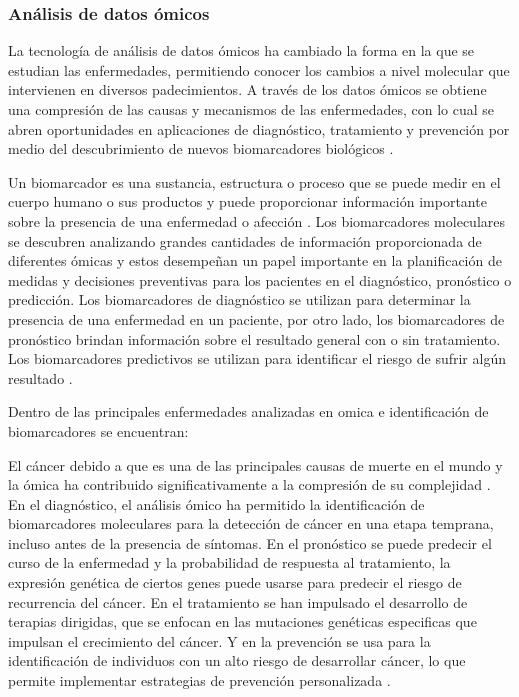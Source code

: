 \subsubsection{Análisis de datos ómicos}

La tecnología de análisis de datos ómicos ha cambiado la forma en la que se estudian las enfermedades, permitiendo conocer los cambios a nivel molecular que intervienen en diversos padecimientos. A través de los datos ómicos se obtiene una compresión de las causas y mecanismos de las enfermedades, con lo cual se abren oportunidades en aplicaciones de diagnóstico, tratamiento y prevención por medio del descubrimiento de nuevos biomarcadores biológicos \citep{reel2021using}.

Un biomarcador es una sustancia, estructura o proceso que se puede medir en el cuerpo humano o sus productos y puede proporcionar información importante sobre la presencia de una enfermedad o afección \citep{strimbu2010biomarkers}. Los biomarcadores moleculares se descubren analizando grandes cantidades de información proporcionada de diferentes ómicas y estos desempeñan un papel importante en la planificación de medidas y decisiones preventivas para los pacientes en el diagnóstico, pronóstico o predicción. Los biomarcadores de diagnóstico se utilizan para determinar la presencia de una enfermedad en un paciente, por otro lado, los biomarcadores de pronóstico brindan información sobre el resultado general con o sin tratamiento. Los biomarcadores predictivos se utilizan para identificar el riesgo de sufrir algún resultado \citep{carlomagno2017diagnostic}.

Dentro de las principales enfermedades analizadas en omica e identificación de biomarcadores se encuentran:

El cáncer debido a que es una de las principales causas de muerte en el mundo y la ómica ha contribuido significativamente a la compresión de su complejidad \citep{sarmiento2020aplicaciones}. En el diagnóstico, el análisis ómico ha permitido la identificación de biomarcadores moleculares para la detección de cáncer en una etapa temprana, incluso antes de la presencia de síntomas. En el pronóstico se puede predecir el curso de la enfermedad y la probabilidad de respuesta al tratamiento, la expresión genética de ciertos genes puede usarse para predecir el riesgo de recurrencia del cáncer. En el tratamiento se han impulsado el desarrollo de terapias dirigidas, que se enfocan en las mutaciones genéticas especificas que impulsan el crecimiento del cáncer. Y en la prevención se usa para la identificación de individuos con un alto riesgo de desarrollar cáncer, lo que permite implementar estrategias de prevención personalizada \citep{munir2019cancer}.

